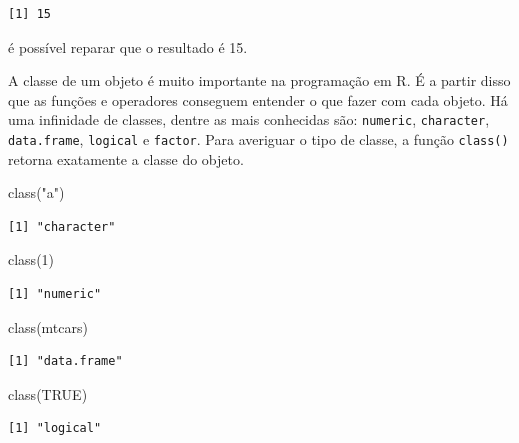 \documentclass[
  12pt,
  letterpaper,
  DIV=11,
  numbers=noendperiod]{scrreprt}
\newenvironment{Shaded}{\begin{snugshade}}{\end{snugshade}}
\newcommand{\ConstantTok}[1]{\textcolor[rgb]{0.56,0.35,0.01}{#1}}
\newcommand{\DecValTok}[1]{\textcolor[rgb]{0.68,0.00,0.00}{#1}}
\newcommand{\FunctionTok}[1]{\textcolor[rgb]{0.28,0.35,0.67}{#1}}
\newcommand{\NormalTok}[1]{\textcolor[rgb]{0.00,0.23,0.31}{#1}}
\newcommand{\StringTok}[1]{\textcolor[rgb]{0.13,0.47,0.30}{#1}}
\theoremstyle{definition}
\theoremstyle{exemplo}
\begin{document}
\begin{verbatim}
[1] 15
\end{verbatim}

\noindent é possível reparar que o resultado é 15.

A classe de um objeto é muito importante na programação em R. É a partir
disso que as funções e operadores conseguem entender o que fazer com
cada objeto. Há uma infinidade de classes, dentre as mais conhecidas
são: \texttt{numeric}, \texttt{character}, \texttt{data.frame},
\texttt{logical} e \texttt{factor}. Para averiguar o tipo de classe, a
função \texttt{class()} retorna exatamente a classe do objeto.

\begin{Shaded}
\begin{Highlighting}[]
\FunctionTok{class}\NormalTok{(}\StringTok{"a"}\NormalTok{)}
\end{Highlighting}
\end{Shaded}

\begin{verbatim}
[1] "character"
\end{verbatim}

\begin{Shaded}
\begin{Highlighting}[]
\FunctionTok{class}\NormalTok{(}\DecValTok{1}\NormalTok{)}
\end{Highlighting}
\end{Shaded}

\begin{verbatim}
[1] "numeric"
\end{verbatim}

\begin{Shaded}
\begin{Highlighting}[]
\FunctionTok{class}\NormalTok{(mtcars)}
\end{Highlighting}
\end{Shaded}

\begin{verbatim}
[1] "data.frame"
\end{verbatim}

\begin{Shaded}
\begin{Highlighting}[]
\FunctionTok{class}\NormalTok{(}\ConstantTok{TRUE}\NormalTok{)}
\end{Highlighting}
\end{Shaded}

\begin{verbatim}
[1] "logical"
\end{verbatim}
\end{document}
